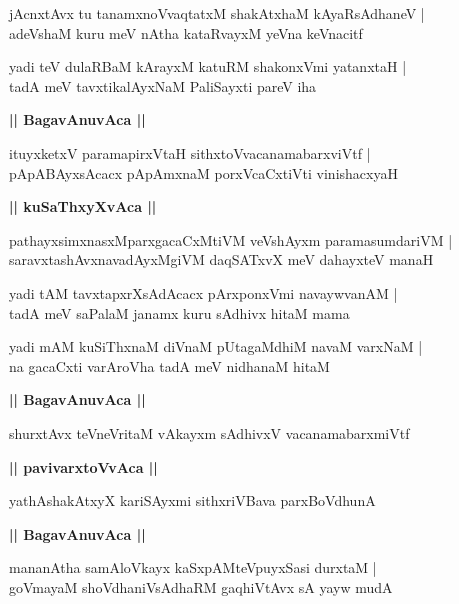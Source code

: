 \documentclass[twoside,12pt,openright]{book}
\newcounter{shloka}[chapter]
\def\uvaca#1{\centerline{{\large\textbf{#1}}}}
\begin{document}
\begin{shloka}%
jAcnxtAvx tu tanamxnoVvaqtatxM shakAtxhaM kAyaRsAdhaneV |\\
adeVshaM kuru meV nAtha kataRvayxM yeVna keVnacitf
\end{shloka}

\begin{shloka}%
yadi teV dulaRBaM kArayxM katuRM shakonxVmi yatanxtaH |\\
tadA meV tavxtikalAyxNaM PaliSayxti pareV iha
\end{shloka}

\uvaca{|| BagavAnuvAca ||}

\begin{shloka}%
ituyxketxV paramapirxVtaH sithxtoVvacanamabarxviVtf |\\
pApABAyxsAcacx pApAmxnaM porxVcaCxtiVti vinishacxyaH
\end{shloka}

\uvaca{|| kuSaThxyXvAca ||}

\begin{shloka}%
pathayxsimxnasxMparxgacaCxMtiVM veVshAyxm paramasumdariVM |\\
saravxtashAvxnavadAyxMgiVM daqSATxvX meV dahayxteV manaH 
\end{shloka}

\begin{shloka}%
yadi tAM tavxtapxrXsAdAcacx pArxponxVmi navaywvanAM |\\
tadA meV saPalaM janamx kuru sAdhivx hitaM mama 
\end{shloka}

\begin{shloka}%
yadi mAM kuSiThxnaM diVnaM pUtagaMdhiM navaM varxNaM |\\
na gacaCxti varAroVha tadA meV nidhanaM hitaM 
\end{shloka}

\uvaca{|| BagavAnuvAca ||}

\begin{shloka}%
shurxtAvx teVneVritaM vAkayxm sAdhivxV vacanamabarxmiVtf 
\end{shloka}

\uvaca{|| pavivarxtoVvAca ||}

\begin{shloka}%
yathAshakAtxyX kariSAyxmi sithxriVBava parxBoVdhunA 
\end{shloka}

\uvaca{|| BagavAnuvAca ||}

\begin{shloka}%
mananAtha samAloVkayx kaSxpAMteVpuyxSasi durxtaM |\\
goVmayaM shoVdhaniVsAdhaRM gaqhiVtAvx sA yayw mudA 
\end{shloka}
\end{document}
